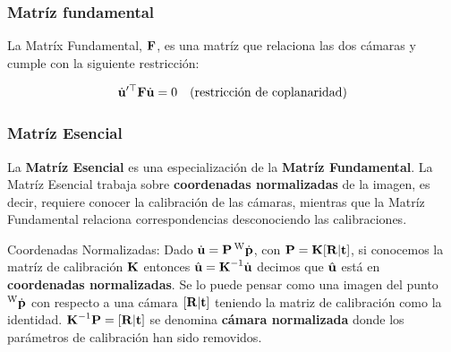 \begin{frame}
    \frametitle{Matríz fundamental}
    \footnotesize

    La Matríx Fundamental, $\boldsymbol{\mathbf{F}}$,  es una matríz que relaciona las dos cámaras y cumple con la siguiente restricción:

    
    \begin{equation*}
        \dot{\boldsymbol{\mathbf{u}}}^{\prime\top} \boldsymbol{\mathbf{F}} \dot{\boldsymbol{\mathbf{u}}} = 0 \quad \text{(restricción de coplanaridad)}
    \end{equation*}
    
\end{frame}


\begin{frame}
    \frametitle{Matríz Esencial}
    \footnotesize

    La {\bf Matríz Esencial} es una especialización de la {\bf Matríz Fundamental}. La Matríz Esencial trabaja sobre {\bf coordenadas  normalizadas}  de la imagen, es decir, requiere conocer la calibración de las cámaras, mientras que la Matríz Fundamental relaciona correspondencias desconociendo las calibraciones.

    \begin{block}{Coordenadas Normalizadas:}
        Dado $\dot{\boldsymbol{\mathbf{u}}} = \boldsymbol{\mathbf{P}} \prescript{\mathrm{\mathrm{W}}}{}{\dot{\boldsymbol{\mathbf{p}}}}$, con $\boldsymbol{\mathbf{P}} = \boldsymbol{\mathbf{K}} [\boldsymbol{\mathbf{R}}|\boldsymbol{\mathbf{t}}]$, si conocemos la matríz de calibración $\boldsymbol{\mathbf{K}}$ entonces $\hat{\boldsymbol{\mathbf{u}}} = {\boldsymbol{\mathbf{K}}}^{-1} \dot{\boldsymbol{\mathbf{u}}}$ decimos que $\hat{\boldsymbol{\mathbf{u}}}$ está en {\bf coordenadas normalizadas}. Se lo puede pensar como una imagen del punto $\prescript{\mathrm{\mathrm{W}}}{}{\dot{\boldsymbol{\mathbf{p}}}}$ con respecto a una cámara $[\boldsymbol{\mathbf{R}}|\boldsymbol{\mathbf{t}}]$ teniendo la matriz de calibración como la identidad. $ {\boldsymbol{\mathbf{K}}}^{-1} \boldsymbol{\mathbf{P}} = [\boldsymbol{\mathbf{R}}| \boldsymbol{\mathbf{t}}]$ se denomina {\bf cámara normalizada} donde los parámetros de calibración han sido removidos.
    \end{block}


\end{frame}
